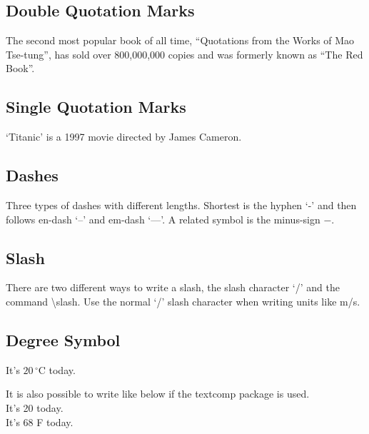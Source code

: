 \documentclass{article}
\begin{document}
\subsection*{Double Quotation Marks}
The second most popular book of all time, ``Quotations from the Works of Mao Tse-tung'', has sold over 800,000,000 copies and was formerly known as ``The Red Book''.

\subsection*{Single Quotation Marks}
`Titanic' is a 1997 movie directed by James Cameron.

\subsection*{Dashes}
Three types of dashes with different lengths. Shortest is the hyphen `-' and then follows en-dash `--' and em-dash `---'. A related symbol is the minus-sign $-$.

\subsection*{Slash}
There are two different ways to write a slash, the slash character `/' and the command \textbackslash slash. Use the normal `/' slash character when writing units like m/s.

\subsection*{Degree Symbol}
It's $20\,^{\circ}\mathrm{C}$ today.

It is also possible to write like below if the textcomp package is used.\\
It's 20 \textcelsius{} today.\\
It's 68 \textdegree{}F today.\\
\end{document}
